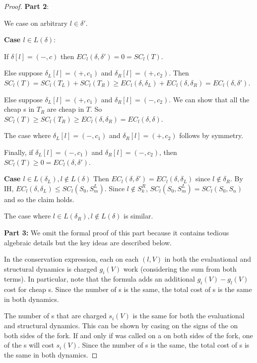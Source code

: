 \begin{proof}
\textbf{Part 2}: 

We case on arbitrary $l \in \delta'$.

\textbf{Case $l \in L(\delta)$}: 

If $\delta[l] = (-,c)$ then $EC_l(\delta, \delta') = 0 = SC_l(T)$.

Else suppose $\delta_L[l] = (+,c_1)$ and $\delta_R[l] = (+,c_2)$. Then $SC_l(T) = SC_l(T_L) + SC_l(T_R) \geq EC_l(\delta, \delta_L) + EC_l(\delta, \delta_R) = EC_l(\delta, \delta')$.

Else suppose $\delta_L[l] = (+,c_1)$ and $\delta_R[l] = (-,c_2)$. We can show that all the cheap \get{}s in $T_R$ are cheap in $T$. So $SC_l(T) \geq SC_l(T_R) \geq EC_l(\delta, \delta_R) = EC_l(\delta, \delta)$.

The case where $\delta_L[l] = (-,c_1)$ and $\delta_R[l] = (+,c_2)$ follows by symmetry.

Finally, if $\delta_L[l] = (-,c_1)$ and $\delta_R[l] = (-,c_2)$, then $SC_l(T) \geq 0 = EC_l(\delta, \delta')$.

\textbf{Case $l \in L(\delta_L), l \not\in L(\delta)$} Then $EC_l(\delta, \delta') = EC_l(\delta, \delta_L)$ since $l \not\in \delta_R$. By IH, $EC_l(\delta, \delta_L) \leq SC_l(S_0, S^L_m)$. Since $l \not\in S^R_k$, $SC_l(S_0, S^L_m) = SC_l(S_0, S_n)$ and so the claim holds.

The case where $l \in L(\delta_R), l \not\in L(\delta)$ is similar.

\textbf{Part 3:} We omit the formal proof of this part because it contains tedious algebraic details but the key ideas are described below.

In the conservation expression, each \get{} on each \farray{} $(l,V)$ in both the evaluational and structural dynamics is charged $g_i(V)$ work (considering the sum from both terms). In particular, note that the formula adds an additional $g_i(V)-g_l(V)$ cost for cheap \get{}s. Since the number of \get{}s is the same, the total cost of \get{}s is the same in both dynamics.

The number of \set{}s that are charged $s_i(V)$ is the same for both the evaluational and structural dynamics. This can be shown by casing on the signs of the \farray{} on both sides of the fork. If and only if \set{} was called on a \farray{} on both sides of the fork, one of the \set{}s will cost $s_i(V)$. Since the number of \set{}s is the same, the total cost of \set{}s is the same in both dynamics.
\end{proof}

